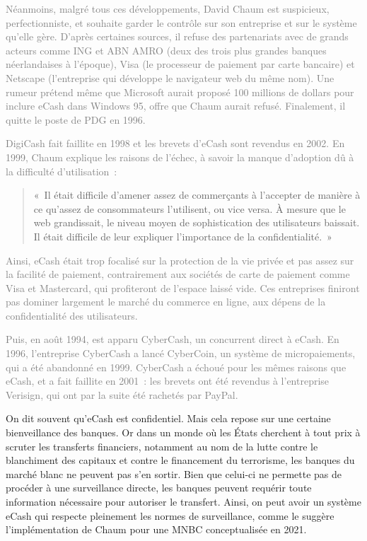 \textcolor{gray}{Néanmoins, malgré tous ces développements, David Chaum est suspicieux, perfectionniste, et souhaite garder le contrôle sur son entreprise et sur le système qu'elle gère. D'après certaines sources, il refuse des partenariats avec de grands acteurs comme ING et ABN AMRO (deux des trois plus grandes banques néerlandaises à l'époque), Visa (le processeur de paiement par carte bancaire) et Netscape (l'entreprise qui développe le navigateur web du même nom). Une rumeur prétend même que Microsoft aurait proposé 100 millions de dollars pour inclure eCash dans Windows 95, offre que Chaum aurait refusé. Finalement, il quitte le poste de PDG en 1996.}

\textcolor{gray}{DigiCash fait faillite en 1998 et les brevets d'eCash sont revendus en 2002. En 1999, Chaum explique les raisons de l'échec, à savoir la manque d'adoption dû à la difficulté d'utilisation~:}

\begin{quote}
«~Il était difficile d'amener assez de commerçants à l'accepter de manière à ce qu'assez de consommateurs l'utilisent, ou vice versa. À mesure que le web grandissait, le niveau moyen de sophistication des utilisateurs baissait. Il était difficile de leur expliquer l'importance de la confidentialité.~»
\end{quote}

\textcolor{gray}{Ainsi, eCash était trop focalisé sur la protection de la vie privée et pas assez sur la facilité de paiement, contrairement aux sociétés de carte de paiement comme Visa et Mastercard, qui profiteront de l'espace laissé vide. Ces entreprises finiront pas dominer largement le marché du commerce en ligne, aux dépens de la confidentialité des utilisateurs.}

\textcolor{gray}{Puis, en août 1994, est apparu CyberCash, un concurrent direct à eCash. En 1996, l'entreprise CyberCash a lancé CyberCoin, un système de micropaiements, qui a été abandonné en 1999. CyberCash a échoué pour les mêmes raisons que eCash, et a fait faillite en 2001~: les brevets ont été revendus à l'entreprise Verisign, qui ont par la suite été rachetés par PayPal.}


On dit souvent qu'eCash est confidentiel. Mais cela repose sur une certaine bienveillance des banques. Or dans un monde où les États cherchent à tout prix à scruter les transferts financiers, notamment au nom de la lutte contre le blanchiment des capitaux et contre le financement du terrorisme, les banques du marché blanc ne peuvent pas s'en sortir. Bien que celui-ci ne permette pas de procéder à une surveillance directe, les banques peuvent requérir toute information nécessaire pour autoriser le transfert. Ainsi, on peut avoir un système eCash qui respecte pleinement les normes de surveillance, comme le suggère l'implémentation de Chaum pour une MNBC conceptualisée en 2021.




